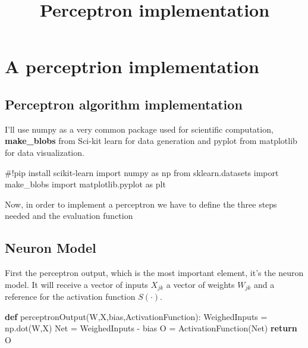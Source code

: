 \documentclass[
  letterpaper,
  DIV=11,
  numbers=noendperiod]{scrartcl}
\title{Perceptron implementation}
\author{}
\date{}
\newenvironment{Shaded}{\begin{snugshade}}{\end{snugshade}}
\newcommand{\CommentTok}[1]{\textcolor[rgb]{0.37,0.37,0.37}{#1}}
\newcommand{\ControlFlowTok}[1]{\textcolor[rgb]{0.00,0.23,0.31}{\textbf{#1}}}
\newcommand{\ImportTok}[1]{\textcolor[rgb]{0.00,0.46,0.62}{#1}}
\newcommand{\KeywordTok}[1]{\textcolor[rgb]{0.00,0.23,0.31}{\textbf{#1}}}
\newcommand{\NormalTok}[1]{\textcolor[rgb]{0.00,0.23,0.31}{#1}}
\newcommand{\OperatorTok}[1]{\textcolor[rgb]{0.37,0.37,0.37}{#1}}
\begin{document}
\maketitle



\section{A perceptrion implementation}

\subsection{Perceptron algorithm
implementation}\label{perceptron-algorithm-implementation}

I'll use numpy as a very common package used for scientific computation,
\textbf{make\_blobs} from Sci-kit learn for data generation and pyplot
from matplotlib for data visualization.

\begin{Shaded}
\begin{Highlighting}[]
\CommentTok{\#!pip install scikit{-}learn}
\ImportTok{import}\NormalTok{ numpy }\ImportTok{as}\NormalTok{ np}
\ImportTok{from}\NormalTok{ sklearn.datasets }\ImportTok{import}\NormalTok{ make\_blobs}
\ImportTok{import}\NormalTok{ matplotlib.pyplot }\ImportTok{as}\NormalTok{ plt}
\end{Highlighting}
\end{Shaded}

Now, in order to implement a perceptron we have to define the three
steps needed and the evaluation function

\subsection{Neuron Model}\label{neuron-model}

First the perceptron output, which is the most important element, it's
the neuron model. It will receive a vector of inputs \(X_{jk}\) a vector
of weights \(W_{jk}\) and a reference for the activation function
\(S(\cdot)\).

\begin{Shaded}
\begin{Highlighting}[]
\KeywordTok{def}\NormalTok{ perceptronOutput(W,X,bias,ActivationFunction):}
\NormalTok{  WeighedInputs }\OperatorTok{=}\NormalTok{ np.dot(W,X)}
\NormalTok{  Net }\OperatorTok{=}\NormalTok{ WeighedInputs }\OperatorTok{{-}}\NormalTok{ bias}
\NormalTok{  O }\OperatorTok{=}\NormalTok{ ActivationFunction(Net)}
  \ControlFlowTok{return}\NormalTok{ O}
\end{Highlighting}
\end{Shaded}
\end{document}
